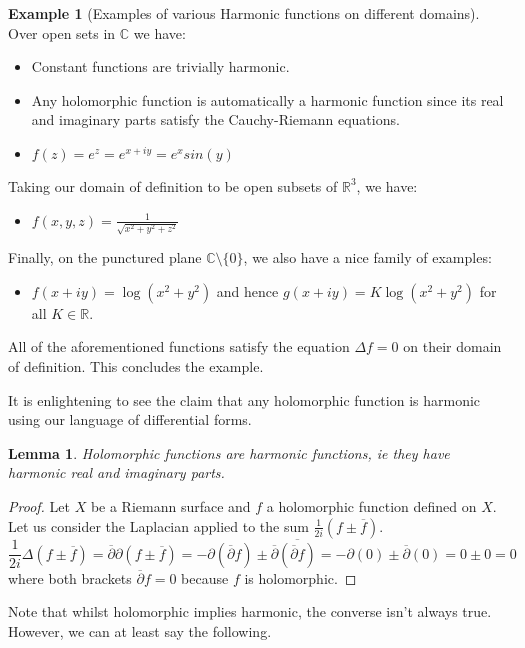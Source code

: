 \documentclass[11pt]{report}
\newtheorem{lemma}[thm]{Lemma}
\theoremstyle{definition}
\newtheorem{example}[thm]{Example}
\begin{document}
\begin{example}[Examples of various Harmonic functions on different domains]\label{harmonicexamples}
  Over open sets in $\mathbb{C}$ we have:
  \begin{itemize} 
    \item Constant functions are trivially harmonic.
    \item Any holomorphic function is automatically a harmonic function since its real and imaginary parts satisfy the Cauchy-Riemann equations.
    \item $f(z)=e^z=e^{x+iy}=e^xsin(y)$
  \end{itemize}
  Taking our domain of definition to be open subsets of $\mathbb{R}^3$, we have:
  \begin{itemize} 
    \item $f(x,y,z)=\frac{1}{\sqrt{x^2+y^2+z^2}}$
  \end{itemize}
  Finally, on the punctured plane $\mathbb{C}\setminus \{0\}$, we also have a nice family of examples:
  \begin{itemize}
    \item $f(x+iy) = \log(x^2 + y^2)$ and hence $g(x+iy)=K \log(x^2+y^2)$ for all $K \in \mathbb{R}$.
  \end{itemize}
  All of the aforementioned functions satisfy the equation $\Delta f = 0$ on their domain of definition. This concludes the example.
\end{example}

It is enlightening to see the claim that any holomorphic function is harmonic using our language of differential forms.
\begin{lemma}\label{HolIsHarm}
  Holomorphic functions are harmonic functions, ie they have harmonic real and imaginary parts. 
\end{lemma} 
\begin{proof}
  Let $X$ be a Riemann surface and $f$ a holomorphic function defined on $X$.
  Let us consider the Laplacian applied to the sum $\frac{1}{2i}(f \pm \overline{f})$.
  \[\frac{1}{2i}\Delta(f \pm \overline{f}) = \overline{\partial}\partial(f \pm \overline{f})=-\partial(\overline{\partial}f) \pm \overline{\partial}\overline{(\overline{\partial}f)}=-\partial(0) \pm \overline{\partial}(0) = 0 \pm 0 = 0\]
  where both brackets $\overline{\partial} f = 0$ because $f$ is holomorphic.
\end{proof}

Note that whilst holomorphic implies harmonic, the converse isn't always true. However, we can at least say the following.
\end{document}
